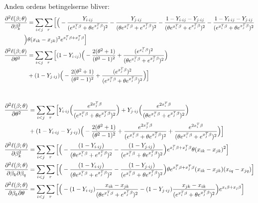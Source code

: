 \documentclass[11pt,a4paper]{article}
\begin{document}
Anden ordens betingelserne bliver:
\textcolor{red}{\begin{align*}
\frac{\partial^2 \ell(\beta;\theta)}{\partial \beta_k^2}
&= \sum_{i<j}\sum_r 
\Big{[}
\Big{(}-\frac{Y_{i\cdot ij}}{(e^{x_i^T\beta}+\theta e^{x_j^T\beta})^2}-\frac{Y_{j\cdot ij}}{(\theta e^{x_i^T\beta}+ e^{x_j^T\beta})^2}-\frac{1-Y_{i\cdot ij}-Y_{j\cdot ij}}{(\theta e^{x_i^T\beta}+ e^{x_j^T\beta})^2}-\frac{1-Y_{i\cdot ij}-Y_{j\cdot ij}}{( e^{x_i^T\beta}+\theta e^{x_j^T\beta})^2}\\
\Big{)}&\theta (x_{ik}-x_{jk})^2 e^{x_i^T\beta+x_j^T\beta}\Big{]}\\
\frac{\partial^2 \ell(\beta;\theta)}{\partial \theta^2}
&= \sum_{i<j}\sum_r \Big{[} (1-Y_{i\cdot ij})\Big{(}-\frac{2(\theta^2+1)}{(\theta^2-1)^2}+\frac{(e^{x_i^T\beta})^2}{(\theta e^{x_i^T\beta} + e^{x_j^T\beta})^2}\Big{)}\\
&+(1-Y_{j\cdot ij})\Big{(}-\frac{2(\theta^2+1)}{(\theta^2-1)^2}+\frac{(e^{x_j^T\beta})^2}{( e^{x_i^T\beta}+\theta e^{x_j^T\beta} )^2}\Big{)}\Big{]}
\\
\end{align*}}

\begin{align*}

\end{align*}


\begin{align*}
\frac{\partial^2 \ell(\beta;\theta)}{\partial \theta^2}
&= \sum_{i<j}\sum_r 
\Big{[}
Y_{i\cdot ij}\Big{(}\frac{e^{2x_j^T\beta}}{(e^{x_i^T\beta}+\theta e^{x_j^T\beta})^2}\Big{)}
+Y_{j\cdot ij}\Big{(}\frac{e^{2x_i^T\beta}}{(\theta e^{x_i^T\beta}+e^{x_j^T\beta})^2}\Big{)}\\
&+(1-Y_{i\cdot ij}-Y_{j\cdot ij}) \Big{(}-\frac{2(\theta^2+1)}{(\theta^2-1)^2}+\frac{e^{2x_j^T\beta}}{(e^{x_i^T\beta}+\theta e^{x_j^T\beta})^2}+\frac{e^{2x_i^T\beta}}{(\theta e^{x_i^T\beta}+e^{x_j^T\beta})^2}\Big{)}\Big{]}\\
\frac{\partial^2 \ell(\beta;\theta)}{\partial \beta_k^2}
&= \sum_{i<j}\sum_r \Big{[}\Big{(} -\frac{(1-Y_{i\cdot ij})}{(\theta e^{x_i^T\beta}+e^{x_j^T\beta})^2}-\frac{(1-Y_{j\cdot ij})}{(e^{x_i^T\beta}+\theta e^{x_j^T\beta})^2}\Big{)}e^{x_i^T\beta+x_j^T\beta}\theta(x_{ik}-x_{jk})^2 \Big{]}\\
\frac{\partial^2 \ell(\beta;\theta)}{\partial \beta_k\partial \beta_q}
&= \sum_{i<j}\sum_r \Big{[}\Big{(}-\frac{(1-Y_{i\cdot ij})}{(\theta e^{x_i^T\beta}+ e^{x_j^T\beta})^2} -\frac{(1-Y_{j\cdot ij})}{(e^{x_i^T\beta}+\theta e^{x_j^T\beta})^2}\Big{)}\theta e^{x_i^T\beta+x_j^T\beta}(x_{ik}-x_{jk})(x_{iq}-x_{jq})\Big{]}\\
\frac{\partial^2 \ell(\beta;\theta)}{\partial \beta_k\partial \theta}
&= \sum_{i<j}\sum_r\Big{[}\Big{(}
-(1-Y_{i \cdot ij})\frac{x_{ik}-x_{jk}}{(\theta e^{x_i^T\beta}+e^{x_j^T\beta})^2}
-(1-Y_{j \cdot ij})\frac{x_{jk}-x_{ik}}{( e^{x_i^T\beta}+\theta e^{x_j^T\beta})^2}\Big{)}e^{x_i\beta+x_j\beta}\Big{]}
\end{align*}
\end{document}
